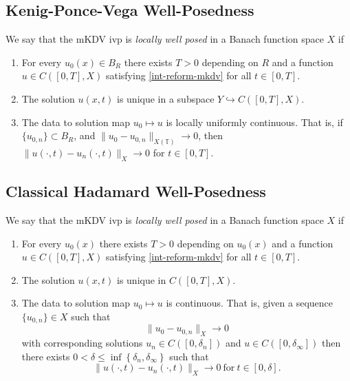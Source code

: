 \documentclass[12pt,reqno]{amsart}
\numberwithin{equation}{section}  %
\newcommand{\ci}{\mathbb{T}}
\begin{document}
        \subsection{Kenig-Ponce-Vega Well-Posedness} 
        \label{ssec:kpv-wp}
	We say that the mKDV ivp is
	\emph{locally well posed} in a Banach function space
	$X$ if 
	\begin{enumerate}
		\item For every $u_{0}(x) \in
	B_R$ there exists $T>0$ depending on $R$ and a function
	\\
	$u \in C([0, T],
  X)$ satisfying \eqref{int-reform-mkdv} for all $t \in [0, T]$.
\item The solution $u(x,t)$ is unique in a subspace $Y \hookrightarrow
  C([0, T], X)$.  
\item The data to solution map $u_0 \mapsto u$ is locally uniformly continuous. That is,
  if$\{u_{0,n}\} \subset B_R$, and 
	$\|u_0 - u_{0, n} \|_{X(\ci)} \to 0$, then $\|u(\cdot, t) - u_{n}(\cdot,t) \|_{X} \to
	0$ for $t \in [0, T]$.
	\end{enumerate}
  \subsection{Classical Hadamard Well-Posedness} 
  \label{ssec:hadamard-wp}
   We say that the mKDV ivp
   is
	\emph{locally well posed} in a Banach function space $X$ if
	\begin{enumerate}
    \item For every $u_{0}(x)$ there exists $T>0$ depending on $u_{0}(x)$
      and a function $u \in C([0, T],
  X)$ satisfying \eqref{int-reform-mkdv} for all $t \in [0, T]$.
\item The solution $u(x,t)$ is unique in $C([0,T], X)$.  
    \item
      The data to solution map $u_0 \mapsto u$ is continuous. That
      is, given a sequence $\{u_{0,n} \} \in X$
      such that $$\|u_{0} - u_{0,n} \|_{X} \to 0$$
      with corresponding solutions $u_{n} \in
      C([0,
      \delta_{n}])$ and $u \in C([0, \delta_{\infty}])$
      then there exists $0 < \delta \le \inf\left\{
      \delta_{n}, \delta_{\infty} \right\}$ such that 
      $$\|u(\cdot, t) - u_{n}(\cdot, t) \|_{X} \to 0 \ \text{for} \ t \in
      [0, \delta].$$
  \end{enumerate}
\end{document}

